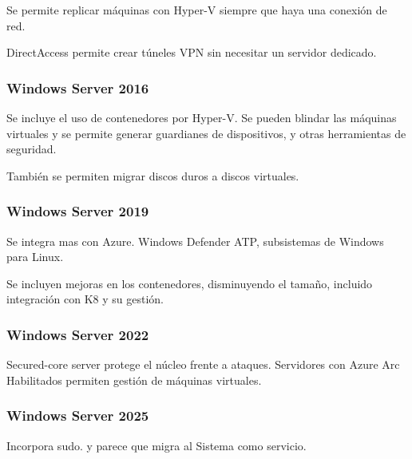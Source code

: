         Se permite replicar máquinas con Hyper-V siempre que haya una conexión de red.

        DirectAccess permite crear túneles VPN sin necesitar un servidor dedicado.

    \subsubsection{Windows Server 2016}
        Se incluye el uso de contenedores por Hyper-V. Se pueden blindar las máquinas virtuales y se permite generar guardianes de dispositivos, y otras herramientas de seguridad.

        También se permiten migrar discos duros a discos virtuales.

    \subsubsection{Windows Server 2019}
        Se integra mas con Azure. Windows Defender ATP, subsistemas de Windows para Linux.

        Se incluyen mejoras en los contenedores, disminuyendo el tamaño, incluido integración con K8 y su gestión.

    \subsubsection{Windows Server 2022}
        Secured-core server protege el núcleo frente a ataques. Servidores con Azure Arc Habilitados permiten gestión de máquinas virtuales.
    \subsubsection{Windows Server 2025}
        Incorpora sudo. y parece que migra al Sistema como servicio.